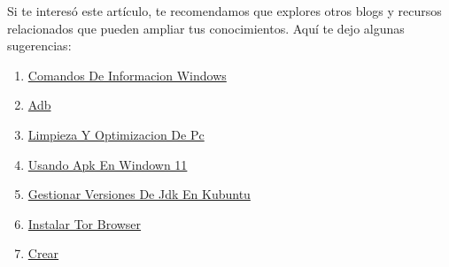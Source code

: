 \documentclass[
  jou,
  floatsintext,
  longtable,
  a4paper,
  nolmodern,
  notxfonts,
  notimes,
  colorlinks=true,linkcolor=blue,citecolor=blue,urlcolor=blue]{apa7}
\providecommand{\tightlist}{%
  \setlength{\itemsep}{0pt}\setlength{\parskip}{0pt}}
\begin{document}
Si te interesó este artículo, te recomendamos que explores otros blogs y
recursos relacionados que pueden ampliar tus conocimientos. Aquí te dejo
algunas sugerencias:

\begin{enumerate}
\def\labelenumi{\arabic{enumi}.}
\tightlist
\item
  \href{https://achalmaedison.netlify.app/tecnologia-seguridad/operating-system/2017-05-21-comandos-de-informacion-windows/index.pdf}{}
  \href{https://achalmaedison.netlify.app/tecnologia-seguridad/operating-system/2017-05-21-comandos-de-informacion-windows}{Comandos
  De Informacion Windows}
\item
  \href{https://achalmaedison.netlify.app/tecnologia-seguridad/operating-system/2019-06-19-adb/index.pdf}{}
  \href{https://achalmaedison.netlify.app/tecnologia-seguridad/operating-system/2019-06-19-adb}{Adb}
\item
  \href{https://achalmaedison.netlify.app/tecnologia-seguridad/operating-system/2021-08-17-limpieza-y-optimizacion-de-pc/index.pdf}{}
  \href{https://achalmaedison.netlify.app/tecnologia-seguridad/operating-system/2021-08-17-limpieza-y-optimizacion-de-pc}{Limpieza
  Y Optimizacion De Pc}
\item
  \href{https://achalmaedison.netlify.app/tecnologia-seguridad/operating-system/2021-10-21-usando-apk-en-windown-11/index.pdf}{}
  \href{https://achalmaedison.netlify.app/tecnologia-seguridad/operating-system/2021-10-21-usando-apk-en-windown-11}{Usando
  Apk En Windown 11}
\item
  \href{https://achalmaedison.netlify.app/tecnologia-seguridad/operating-system/2022-05-12-gestionar-versiones-de-jdk-en-kubuntu/index.pdf}{}
  \href{https://achalmaedison.netlify.app/tecnologia-seguridad/operating-system/2022-05-12-gestionar-versiones-de-jdk-en-kubuntu}{Gestionar
  Versiones De Jdk En Kubuntu}
\item
  \href{https://achalmaedison.netlify.app/tecnologia-seguridad/operating-system/2022-07-21-instalar-tor-browser/index.pdf}{}
  \href{https://achalmaedison.netlify.app/tecnologia-seguridad/operating-system/2022-07-21-instalar-tor-browser}{Instalar
  Tor Browser}
\item
  \href{https://achalmaedison.netlify.app/tecnologia-seguridad/operating-system/2022-08-14-crear-enlaces-duros-o-hard-link-en-linux/index.pdf}{}
  \href{https://achalmaedison.netlify.app/tecnologia-seguridad/operating-system/2022-08-14-crear-enlaces-duros-o-hard-link-en-linux}{Crear
}
\end{enumerate}
\end{document}
